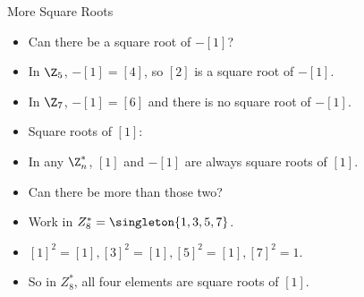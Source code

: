 \documentclass{beamer}
\begin{document}
\begin{frame}{More Square Roots}

\begin{itemize}
  \item Can there be a square root of $-[1]$?
  \item In $\Z_5$, $-[1] = [4]$, so $[2]$ is a square root of $-[1]$.
  \item In $\Z_7$, $-[1] = [6]$ and there is no square root of $-[1]$.
  \item Square roots of $[1]$:
  \item In any $\Z_n^*$, $[1]$ and $-[1]$ are always square roots of $[1]$.
  \item Can there be more than those two?
  \item Work in $Z_8^* = \singleton{1,3,5,7}$.
  \item $[1]^2=[1],[3]^2=[1],[5]^2=[1],[7]^2=1$.
  \item So in $Z_8^*$, all four elements are square roots of $[1]$.
\end{itemize}

\end{frame}
\end{document}
